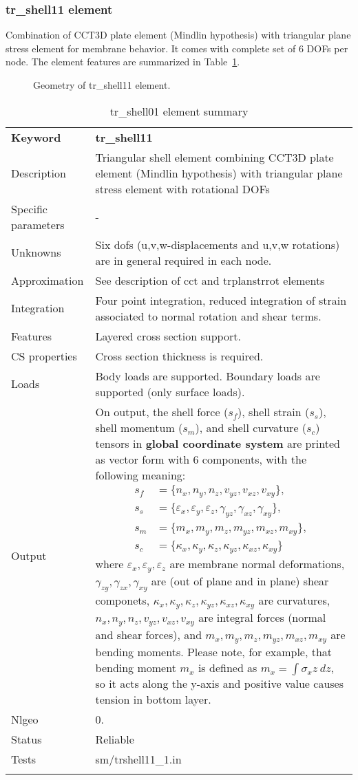 \documentclass[a4paper]{article}
\newcommand{\param}[1]{\texttt{#1}} %
\newcommand{\templabel}{}%
\newcommand{\tempcaption}{}%
\newcounter{nelpar}
\newenvironment{elementsummary}[5]{%
  \gdef\tempcaption{#4}%
  \gdef\templabel{#5}%
  \setcounter{nelpar}{0}%
  \begin{center} %
    \begin{table}[!htb] %
      \begin{tabular}{|l|p{9cm}|}\hline %
        {\bf Keyword} & \bf{#1}\\ %
        {Description} & {#2}\\ %
        {Specific parameters} & {#3}\\ \hline %
}{
  \\ \hline %
      \end{tabular}%
      \caption{\tempcaption}%
      \label{\templabel}%
    \end{table}%
  \end{center}%
}
\newcommand{\elementParam}[1]{%
  \ifthenelse{\value{nelpar}>0} %
             {&{#1}}%
             {\setcounter{nelpar}{1}Parameters&{#1}}%
             \\%
}
\newcommand{\elementDescription}[2]{{#1} & {#2}\\ }
\begin{document}
\subsubsection {tr\_shell11  element}
Combination of CCT3D plate element (Mindlin hypothesis) with triangular plane stress element
for membrane behavior. It comes with complete set of 6 DOFs per node. 
The element features are summarized in Table~\ref{trshell01summary}.
\begin{figure}[htb]
 \centering
 \begin{makeimage}
  
 \end{makeimage}
 \caption{Geometry of tr\_shell11 element.}
\end{figure}

\begin{elementsummary}{tr\_shell11}{Triangular shell element combining CCT3D plate element (Mindlin hypothesis) with triangular plane stress element with rotational DOFs}{-}{tr\_shell01 element summary}{trshell01summary}
\elementDescription{Unknowns}{Six dofs (u,v,w-displacements and u,v,w rotations) are in general required in each node.}
\elementDescription{Approximation}{See description of cct and trplanstrrot elements}
\elementDescription{Integration}{Four point integration, reduced integration of strain associated to normal rotation and shear terms.}
\elementDescription{Features}{Layered cross section support.}
\elementDescription{CS properties}{Cross section thickness is required.}
\elementDescription{Loads}{Body loads are supported. Boundary loads are supported (only surface loads).}
\elementDescription{Output}{On output, the shell force ($s_f$), shell strain ($s_s$), shell momentum ($s_m$), and shell curvature ($s_c$) tensors in \textbf{global coordinate system} are printed as vector form with 6 components, with the following meaning:
\begin{align*}
s_f &= \{n_x, n_y, n_z, v_{yz}, v_{xz}, v_{xy}\},\\
s_s &= \{\varepsilon_x, \varepsilon_y, \varepsilon_z, \gamma_{yz}, \gamma_{xz}, \gamma_{xy}\},\\
s_m &= \{m_x, m_y, m_z, m_{yz}, m_{xz}, m_{xy}\},\\
s_c &= \{\kappa_x, \kappa_y, \kappa_z, \kappa_{yz}, \kappa_{xz}, \kappa_{xy}\}
\end{align*}
where $\varepsilon_x, \varepsilon_y, \varepsilon_z$ are membrane normal deformations, $\gamma_{zy}, \gamma_{zx}, \gamma_{xy}$ are (out of plane and in plane) shear componets, $\kappa_x, \kappa_y, \kappa_z, \kappa_{yz}, \kappa_{xz}, \kappa_{xy}$ are curvatures, $n_x, n_y, n_z, v_{yz}, v_{xz}, v_{xy}$ are integral forces (normal and shear forces), and $m_x, m_y, m_z, m_{yz}, m_{xz}, m_{xy}$ are bending moments. 
Please note, for example, that bending moment $m_x$ is defined as $m_x=\int \sigma_x z\ dz$, so it acts along the y-axis and positive value causes tension in bottom layer.}
\elementDescription{Nlgeo}{0.}
\elementDescription{Status}{Reliable}
\elementDescription{Tests}{sm/trshell11_1.in}
\end{elementsummary}
\end{document}
